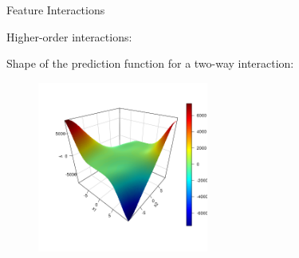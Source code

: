 \documentclass[11pt,compress,t,notes=noshow, aspectratio=169, xcolor=table]{beamer}
\begin{document}
\begin{frame}{Feature Interactions }


Higher-order interactions:

Shape of the prediction function for a two-way interaction:

\begin{figure}
\includegraphics[width = 0.5\textwidth]{figure/interaction}
\end{figure}
\end{frame}



\end{document}
